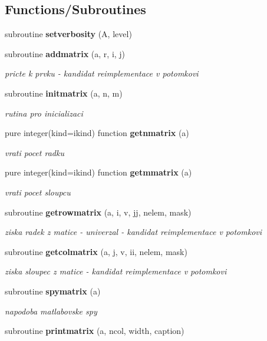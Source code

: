 \subsection*{Functions/\+Subroutines}
\begin{DoxyCompactItemize}
\item 
subroutine {\bf setverbosity} (A, level)
\item 
subroutine {\bf addmatrix} (a, r, i, j)
\begin{DoxyCompactList}\small\item\em pricte k prvku -\/ kandidat reimplementace v potomkovi \end{DoxyCompactList}\item 
subroutine {\bf initmatrix} (a, n, m)
\begin{DoxyCompactList}\small\item\em rutina pro inicializaci \end{DoxyCompactList}\item 
pure integer(kind=ikind) function {\bf getnmatrix} (a)
\begin{DoxyCompactList}\small\item\em vrati pocet radku \end{DoxyCompactList}\item 
pure integer(kind=ikind) function {\bf getmmatrix} (a)
\begin{DoxyCompactList}\small\item\em vrati pocet sloupcu \end{DoxyCompactList}\item 
subroutine {\bf getrowmatrix} (a, i, v, jj, nelem, mask)
\begin{DoxyCompactList}\small\item\em ziska radek z matice -\/ univerzal -\/ kandidat reimplementace v potomkovi \end{DoxyCompactList}\item 
subroutine {\bf getcolmatrix} (a, j, v, ii, nelem, mask)
\begin{DoxyCompactList}\small\item\em ziska sloupec z matice -\/ kandidat reimplementace v potomkovi \end{DoxyCompactList}\item 
subroutine {\bf spymatrix} (a)
\begin{DoxyCompactList}\small\item\em napodoba matlabovske spy \end{DoxyCompactList}\item 
subroutine {\bf printmatrix} (a, ncol, width, caption)

\end{DoxyCompactItemize}

